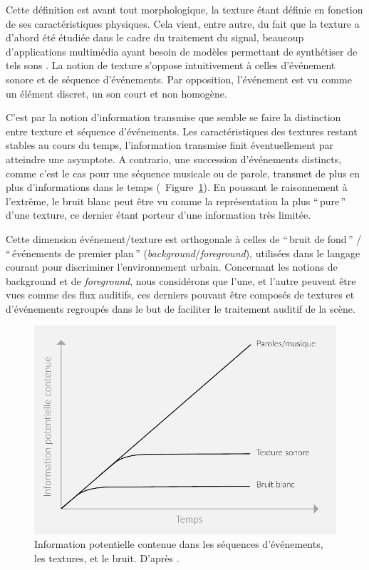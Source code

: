 Cette définition est avant tout morphologique, la texture étant définie en fonction de ses caractéristiques physiques. Cela vient, entre autre, du fait que la texture a d'abord été étudiée dans le cadre du traitement du signal, beaucoup d'applications multimédia ayant besoin de  modèles permettant de synthétiser de tels sons \citep{schwarz2011state}. La notion de texture s'oppose intuitivement à celles d'événement sonore et de séquence d'événements. Par opposition, l'événement est vu comme un élément discret, un son court et non homogène.

C'est par la notion d'information transmise que semble se faire la distinction entre texture et séquence d'événements. Les caractéristiques des textures restant stables au cours du temps, l'information transmise finit éventuellement par atteindre une asymptote. A contrario, une succession d'événements distincts, comme c'est le cas pour une séquence musicale ou de parole, transmet de plus en plus d'informations dans le temps (\cf~Figure~\ref{fig:texture}). En poussant le raisonnement à l’extrême, le bruit blanc peut être vu comme la représentation la plus ``\,pure\,'' d'une texture, ce dernier étant porteur d'une information très limitée.

Cette dimension événement/texture est orthogonale à celles de ``\,bruit de fond\,'' / ``\,événements de premier plan\,'' (\emph{background}/\emph{foreground}), utilisées dans le langage courant pour discriminer l’environnement urbain. Concernant les notions de background et de \emph{foreground}, nous considérons que l'une, et l'autre peuvent être vues comme des flux auditifs, ces derniers pouvant être composés de textures et d’événements regroupés dans le but de faciliter le traitement auditif de la scène.

\begin{figure}[t]
        \myfloatalign
        \includegraphics[width=.8\linewidth]{gfx/ch_3/texture}
        \caption[Information potentielle contenue dans les séquences d'événements, les textures, et le bruit.]{Information potentielle contenue dans les séquences d'événements, les textures, et le bruit. D'après \citep{saint1995classification}.}\label{fig:texture}
\end{figure}

